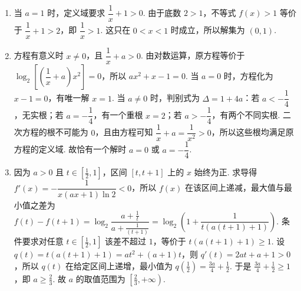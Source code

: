 \begin{solution}
\begin{enumerate}
\item 当 \(a=1\) 时，定义域要求 \(\dfrac1x+1>0\). 由于底数 \(2>1\)，不等式 \(f(x)>1\) 等价于 \(\dfrac1x+1>2\)，即 \(\dfrac1x>1\). 这只在 \(0<x<1\) 时成立，所以解集为 \((0,1)\).
\item 方程有意义时 \(x\ne0\)，且 \(\dfrac1x+a>0\). 由对数运算，原方程等价于 \(\log_2\left[\left(\dfrac1x+a\right)x^2\right]=0\)，所以 \(ax^2+x-1=0\). 当 \(a=0\) 时，方程化为 \(x-1=0\)，有唯一解 \(x=1\). 当 \(a\ne0\) 时，判别式为 \(\Delta=1+4a\)：若 \(a<-\dfrac14\)，无实根；若 \(a=-\dfrac14\)，有一个重根 \(x=2\)；若 \(a>-\dfrac14\)，有两个不同实根. 二次方程的根不可能为 \(0\)，且由方程可知 \(\dfrac1x+a=\dfrac1{x^2}>0\)，所以这些根均满足原方程的定义域. 故恰有一个解时 \(a=0\) 或 \(a=-\dfrac14\).
\item 因为 \(a>0\) 且 \(t\in[\frac12,1]\)，区间 \([t,t+1]\) 上的 \(x\) 始终为正. 求导得 \(f'(x)=-\dfrac{1}{x(ax+1)\ln2}<0\)，所以 \(f(x)\) 在该区间上递减，最大值与最小值之差为
\(f(t)-f(t+1)=\log_2\dfrac{a+\frac{1}{t}}{a+\frac{1}{(t+1)}}=\log_2\left(1+\dfrac{1}{t\left(a(t+1)+1\right)}\right)\).
条件要求对任意 \(t\in[\frac12,1]\) 该差不超过 \(1\)，等价于 \(t\left(a(t+1)+1\right)\geqslant1\). 设 \(q(t)=t\left(a(t+1)+1\right)=at^2+(a+1)t\)，则 \(q'(t)=2at+a+1>0\)，所以 \(q(t)\) 在给定区间上递增，最小值为 \(q(\frac12)=\frac{3a}{4}+\frac12\). 于是 \(\frac{3a}{4}+\frac12\geqslant1\)，即 \(a\geqslant\frac23\). 故 \(a\) 的取值范围为 \(\left[\frac23,+\infty\right)\).
\end{enumerate}
\end{solution}
